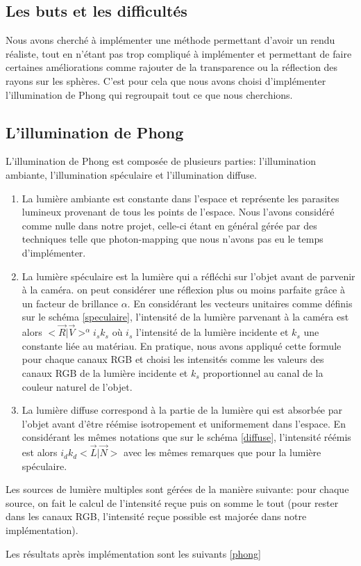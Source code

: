 \subsection{Les buts et les difficultés}
Nous avons cherché à implémenter une méthode permettant d'avoir un rendu réaliste, tout en n'étant pas trop compliqué à implémenter et permettant de faire certaines améliorations comme rajouter de la transparence ou la réflection des rayons sur les sphères. C'est pour cela que nous avons choisi d'implémenter l'illumination de Phong qui regroupait tout ce que nous cherchions.

\subsection{L'illumination de Phong}

L'illumination de Phong est composée de plusieurs parties: l'illumination ambiante, l'illumination spéculaire et l'illumination diffuse.
\begin{enumerate}
\item La lumière ambiante est constante dans l'espace et représente les parasites lumineux provenant de tous les points de l'espace. Nous l'avons considéré comme nulle dans notre projet, celle-ci étant en général gérée par des techniques telle que photon-mapping que nous n'avons pas eu le temps d'implémenter.
\item La lumière spéculaire est la lumière qui a réfléchi sur l'objet avant de parvenir à la caméra. on peut considérer une réflexion plus ou moins parfaite grâce à un facteur de brillance $\alpha$. En considérant les vecteurs unitaires comme définis sur le schéma \ref{speculaire}, l'intensité de la lumière parvenant à la caméra est alors $<\vec{R}|\vec{V}>^{\alpha} i_{s} k_{s}$ où $i_{s}$ l'intensité de la lumière incidente et $k_{s}$ une constante liée au matériau. En pratique, nous avons appliqué cette formule pour chaque canaux RGB et choisi les intensités comme les valeurs des canaux RGB de la lumière incidente et $k_{s}$ proportionnel au canal de la couleur naturel de l'objet.
\item La lumière diffuse correspond à la partie de la lumière qui est absorbée par l'objet avant d'être réémise isotropement et uniformement dans l'espace. En considérant les mêmes notations que sur le schéma \ref{diffuse}, l'intensité réémis est alors $i_{d}k_{d}<\vec{L}|\vec{N}>$ avec les mêmes remarques que pour la lumière spéculaire.
\end{enumerate}

Les sources de lumière multiples sont gérées de la manière suivante: pour chaque source, on fait le calcul de l'intensité reçue puis on somme le tout (pour rester dans les canaux RGB, l'intensité reçue possible est majorée dans notre implémentation).

Les résultats après implémentation sont les suivants \ref{phong}
